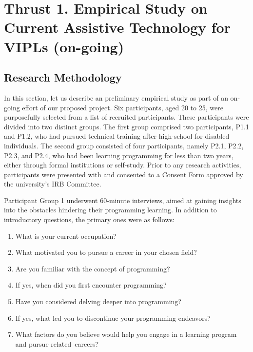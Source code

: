 \section{Thrust 1. Empirical Study on Current Assistive Technology for VIPLs (on-going)}
\label{sec:thrust1}

\subsection{Research Methodology}

In this section, let us describe an preliminary empirical study as
part of an on-going effort of our proposed project. Six participants,
aged 20 to 25, were purposefully selected from a list of recruited
participants. These participants were divided into two distinct
groups. The first group comprised two participants, P1.1 and P1.2, who
had pursued technical training after high-school for disabled
individuals. The second group consisted of four participants, namely
P2.1, P2.2, P2.3, and P2.4, who had been learning programming for less
than two years, either through formal institutions or
self-study. Prior to any research activities, participants were
presented with and consented to a Consent Form approved by the
university's IRB Committee.

Participant Group 1 underwent 60-minute interviews, aimed at gaining
insights into the obstacles hindering their programming learning. In
addition to introductory questions, the primary ones were as
follows:

\begin{enumerate}

\item What is your current occupation?
  
\item What motivated you to pursue a career in your chosen field?

\item Are you familiar with the concept of programming?

\item If yes, when did you first encounter programming?
  
\item Have you considered delving deeper into programming?

\item If yes, what led you to discontinue your programming endeavors?

\item What factors do you believe would help you engage in a learning program and pursue related~careers?

\end{enumerate}
  
